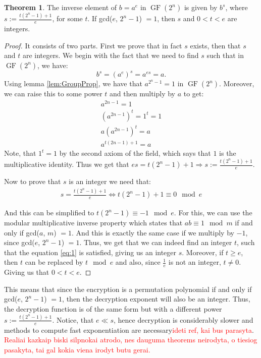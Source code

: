 \documentclass{Resources/UoBLab1}
\theoremstyle{definition}
\newtheorem{theorem}{Theorem}[section]
\begin{document}
\begin{theorem}
    The inverse element of $b = a^e$ in $\operatorname{GF}(2^n)$ is given by $b^s$, where $s := \frac{t(2^n-1) + 1}{e}$, for some $t$. If gcd($e$, $2^n-1$) $= 1$, then $s$ and $0 < t < e$ are integers.
\end{theorem}
\begin{proof}
    It consists of two parts. First we prove that in fact $s$ exists, then that $s$ and $t$ are integers. We begin with the fact that we need to find $s$ such that in $\operatorname{GF}(2^n)$, we have:
    \[
        b^s = (a^e)^s = a^{es} = a.
    \]
    Using lemma \ref{lem:GroupProp}, we have that $a^{2^n-1} = 1$ in $\operatorname{GF}(2^n)$. Moreover, we can raise this to some power $t$ and then multiply by $a$ to get:
    \begin{gather*}
        a^{2n-1} = 1\\
        (a^{2n-1}) ^ t = 1^t = 1\\
        a (a^{2n-1})^t = a\\
        a^{t(2n-1)+1} = a
    \end{gather*}
    Note, that $1^t=1$ by the second axiom of the field, which says that $1$ is the multiplicative identity. Thus we get that \(es = t(2^n-1)+1 \Rightarrow s := \frac{t(2^n-1)+1}{e}\).\medskip

    \noindent Now to prove that $s$ is an integer we need that:
    \begin{equation}
        \begin{array}{c}
            s = \frac{t(2^n-1) + 1}{e} \iff t(2^n-1) + 1 \equiv 0 \mod e
        \end{array}\label{eq:1}
    \end{equation}
    
    \noindent And this can be simplified to \(t(2^n-1) \equiv -1 \mod e\). For this, we can use the modular multiplicative inverse property which states that $ab \equiv 1 \mod m$ if and only if gcd($a$, $m$) $= 1$. And this is exactly the same case if we multiply by $-1$, since gcd($e$, $2^n-1$) $= 1$. Thus, we get that we can indeed find an integer $t$, such that the equation \eqref{eq:1} is satisfied, giving us an integer $s$. Moreover, if $t \ge e$, then $t$ can be replaced by $t \mod e$ and also, since $\frac{1}{e}$ is not an integer, $t \ne 0$. Giving us that $0 < t < e$.
\end{proof}
This means that since the encryption is a permutation polynomial if and only if gcd($e$, $2^n-1$) $= 1$, then the decryption exponent will also be an integer. Thus, the decryption function is of the same form but with a different power $s := \frac{t(2^n-1)+1}{e}$. Notice, that $e \ll s$, hence decryption is considerably slower and methods to compute fast exponentiation are necessary\textcolor{red}{ideti ref, kai bus parasyta}.
\textcolor{red}{Realiai kazkaip biski silpnokai atrodo, nes dauguma theorems neirodyta, o tiesiog pasakyta, tai gal kokia viena irodyt butu gerai.}
\end{document}
